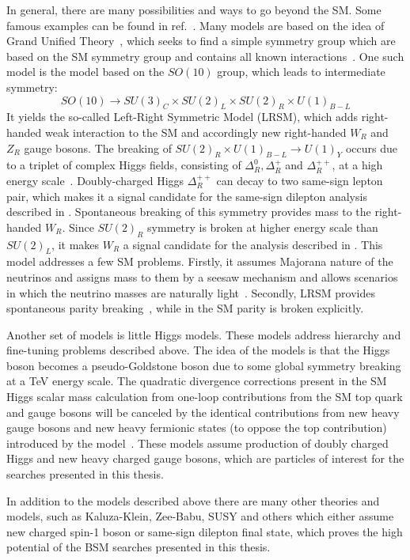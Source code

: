 In general, there are many possibilities and ways to go beyond the SM. 
Some famous examples can be found in ref.~\cite{Ellis:2011jb}.
Many models are based on the idea of Grand Unified Theory~\cite{GUT_bigPaper},
which seeks to find a simple symmetry group which are based on the SM symmetry group
and contains all known interactions~\cite{Langacker:1984dc,Cvetic:1995zs}.
One such model is the model based on the $SO(10)$ group, which leads to intermediate symmetry:
\begin{equation}
SO(10) \to SU(3)_C \times SU(2)_L \times SU(2)_R \times U(1)_{B-L}
\end{equation}
It yields the so-called Left-Right Symmetric Model (LRSM), which adds
right-handed weak interaction to the SM and accordingly new right-handed $W_R$ and $Z_R$ gauge bosons.
The breaking of $SU(2)_R \times U(1)_{B-L} \to U(1)_Y$ occurs due to a triplet of complex Higgs fields, consisting of $\Delta^0_R, \Delta^+_R$ and $\Delta^{++}_R$, at a high energy scale~\cite{Azuelos:2004mwa}.
Doubly-charged Higgs $\Delta^{++}_R$ can decay to two same-sign lepton pair, which makes it a signal candidate for the same-sign dilepton analysis described in . Spontaneous breaking of this symmetry provides mass to the right-handed $W_R$.
Since $SU(2)_R$ symmetry is broken at higher energy scale than $SU(2)_L$, it makes
$W_R$ a signal candidate for the analysis described in .
This model addresses a few SM problems. Firstly, it assumes Majorana nature of the neutrinos and assigns mass to them by a seesaw mechanism and allows scenarios in which the neutrino masses are naturally light~\cite{Mohapatra:1979ia}. 
Secondly, LRSM provides spontaneous parity breaking~\cite{Grimus:1993fx}, while in the SM parity is broken explicitly.

Another set of models is little Higgs models.
These models address hierarchy and fine-tuning problems described above.
The idea of the models is that the Higgs boson becomes a pseudo-Goldstone boson due to some global symmetry breaking at a TeV energy scale.
The quadratic divergence corrections present in the SM Higgs scalar mass calculation from one-loop contributions from the SM top quark and gauge bosons will be canceled 
by the identical contributions from new heavy gauge bosons and new heavy fermionic states (to oppose the top contribution) introduced by the model~\cite{Han:2003wu,Brak}.
These models assume production of doubly charged Higgs and new heavy charged gauge bosons, which are particles of interest for the searches presented in this thesis.

In addition to the models described above there are many other theories and models, such as Kaluza-Klein, Zee-Babu, SUSY and others which either assume new charged spin-1 boson or same-sign dilepton final state, which proves the high potential of the BSM searches presented in this thesis.